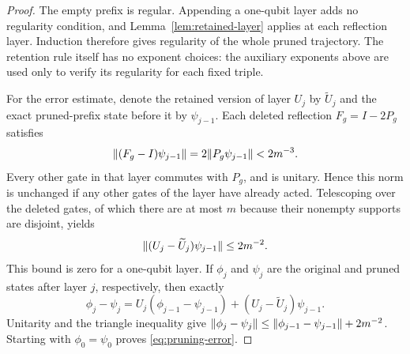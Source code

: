 \begin{proof}
The empty prefix is regular.  Appending a one-qubit layer adds no
regularity condition, and Lemma~\ref{lem:retained-layer} applies at
each reflection layer.  Induction therefore gives regularity of the
whole pruned trajectory.  The retention rule itself has no exponent
choices: the auxiliary exponents above are used only to verify its
regularity for each fixed triple.

For the error estimate, denote the retained version of layer $U_j$ by
$\widetilde U_j$ and the exact pruned-prefix state before it by
$\psi_{j-1}$.  Each deleted reflection $F_g=I-2P_g$ satisfies
\[
 \lVert(F_g-I)\psi_{j-1}\rVert
 =2\lVert P_g\psi_{j-1}\rVert<2m^{-3}.
\]
Every other gate in that layer commutes with $P_g$, and is unitary.
Hence this norm is unchanged if any other gates of the layer have
already acted.  Telescoping over the deleted gates, of which there
are at most $m$ because their nonempty supports are disjoint, yields
\[
 \lVert(U_j-\widetilde U_j)\psi_{j-1}\rVert\le2m^{-2}.
\]
This bound is zero for a one-qubit layer.  If $\phi_j$ and $\psi_j$
are the original and pruned states after layer $j$, respectively,
then exactly
\[
 \phi_j-\psi_j
 =U_j(\phi_{j-1}-\psi_{j-1})
   +(U_j-\widetilde U_j)\psi_{j-1}.
\]
Unitarity and the triangle inequality give
$\lVert\phi_j-\psi_j\rVert\le\lVert\phi_{j-1}-\psi_{j-1}\rVert+2m^{-2}$.
Starting with $\phi_0=\psi_0$ proves \eqref{eq:pruning-error}.
\end{proof}
